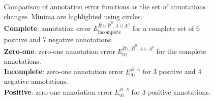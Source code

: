 \documentclass{jsfds} %
\begin{document}




\begin{figure}[H]
  
  \caption{Comparison of annotation error functions as the set of
    annotations changes. Minima are highlighted using circles.
    \protect\\
    \textbf{Complete}: annotation error
    $E_{\text{incomplete}}^{\hat R\cup \hat R^0,A\cup A^0}$ 
    for a complete set of 6
    positive and 7 negative annotations.
    \protect\\
    \textbf{Zero-one}: zero-one annotation error $E_{01}^{
      \hat R\cup \hat R^0,A\cup A^0}$
    for the complete annotations.
    \protect\\
    \textbf{Incomplete}: zero-one annotation error $E_{01}^{\hat R,A}$
    for 3 positive and 4 negative annotations.
    \protect\\
    \textbf{Positive}: zero-one annotation error $E_{01}^{\hat R,A}$
    for 3 positive annotations.}
  \label{fig:variable-density-sigerr}
\end{figure}
\end{document}
